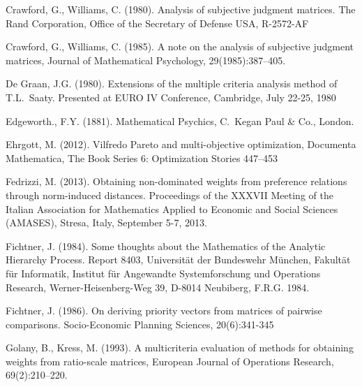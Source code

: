 \documentclass{article}
\theoremstyle{plain}
\begin{document}
\begin{thebibliography}{99}
Crawford, G., Williams, C. (1980).
Analysis of subjective judgment matrices. The Rand Corporation, Of{\kern0pt}f{\kern0pt}ice
of the Secretary of Defense USA, R-2572-AF


Crawford, G., Williams, C. (1985).
A note on the analysis of subjective judgment matrices,
Journal of Mathematical Psychology,
29(1985):387--405.


De Graan, J.G. (1980).
Extensions of the multiple criteria analysis method of T.L.~Saaty.
Presented at EURO IV Conference, Cambridge, July 22-25, 1980


Edgeworth., F.Y. (1881).
Mathematical Psychics,
C.~Kegan Paul \& Co., London.

Ehrgott, M. (2012). Vilfredo Pareto and multi-objective optimization,
Documenta Mathematica, The Book Series 6: Optimization Stories 447--453


Fedrizzi, M. (2013).
Obtaining non-dominated weights from preference relations through norm-induced distances.
Proceedings of the
XXXVII Meeting of the Italian Association for Mathematics Applied to Economic and Social Sciences (AMASES),
Stresa, Italy, September 5-7, 2013.

Fichtner, J. (1984).
Some thoughts about the Mathematics of the Analytic Hierarchy Process.
Report 8403,
Universit\"at der Bundeswehr M\"unchen,
Fakult\"at f\"ur Informatik,
Institut f\"ur Angewandte Systemforschung und Operations Research,
Werner-Heisenberg-Weg 39, D-8014 Neubiberg, F.R.G.
1984.


Fichtner, J. (1986).
On deriving priority vectors from matrices of pairwise comparisons.
Socio-Economic Planning Sciences,
20(6):341-345


Golany, B., Kress, M. (1993).
A multicriteria evaluation of methods for obtaining weights from ratio-scale matrices,
European Journal of Operations Research,
69(2):210--220.


\end{thebibliography}
\end{document}
